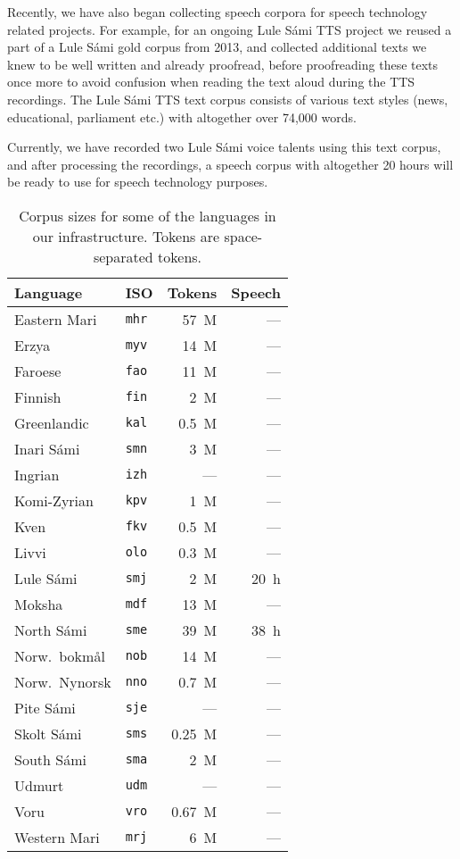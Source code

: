 \documentclass[free]{flammie}
\begin{document}
Recently, we have also began collecting speech corpora for speech technology
related projects.  For example, for an ongoing Lule Sámi TTS  project we reused
a part of a Lule Sámi gold corpus from 2013, and collected additional texts we
knew to be well written and already proofread, before proofreading these texts
once more to avoid confusion when reading the text aloud during the TTS
recordings.  The Lule Sámi TTS text corpus consists of various text styles
(news, educational, parliament etc.) with altogether over 74,000 words.

Currently, we have recorded two Lule Sámi voice talents using this text corpus,
and after processing the recordings, a speech corpus with altogether 20 hours
will be ready to use for speech technology purposes.



\begin{table}[htb]
\begin{small}
    \centering
    \begin{tabular}{llrr}
        Language & ISO      & Tokens & Speech \\
        \toprule
Eastern Mari & \texttt{mhr} &   57~M & --- \\
Erzya        & \texttt{myv} &   14~M & --- \\
Faroese      & \texttt{fao} &   11~M & --- \\
Finnish      & \texttt{fin} &    2~M & --- \\
Greenlandic  & \texttt{kal} &  0.5~M & --- \\
Inari Sámi   & \texttt{smn} &    3~M & --- \\
Ingrian      & \texttt{izh} &    --- & --- \\
Komi-Zyrian  & \texttt{kpv} &    1~M & --- \\
Kven         & \texttt{fkv} &  0.5~M & --- \\
Livvi        & \texttt{olo} &  0.3~M & --- \\
Lule Sámi    & \texttt{smj} &    2~M & 20~h\\
Moksha       & \texttt{mdf} &   13~M & --- \\
North Sámi   & \texttt{sme} &   39~M & 38~h\\
Norw.\ bokmål & \texttt{nob} &   14~M & --- \\
Norw.\ Nynorsk& \texttt{nno} &  0.7~M & --- \\
Pite Sámi    & \texttt{sje} &    --- & --- \\
Skolt Sámi   & \texttt{sms} & 0.25~M & --- \\
South Sámi   & \texttt{sma} &    2~M & --- \\
Udmurt       & \texttt{udm} &    --- & --- \\
Voru         & \texttt{vro} & 0.67~M & --- \\
Western Mari & \texttt{mrj} &    6~M & --- \\
    \end{tabular}
    \caption{Corpus sizes for some of the languages in our infrastructure.
    Tokens are space-separated tokens.\label{tab:corpora}}
\end{small}
\end{table}
\end{document}
